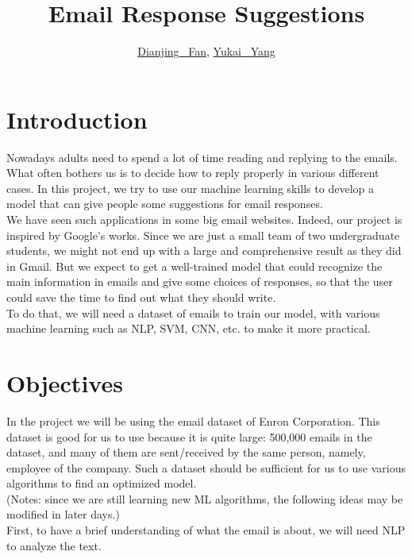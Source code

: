 \documentclass{article}
\title{Email Response Suggestions}
\author{\href{mailto:author1@nyu.edu}{Dianjing \ Fan}, \href{mailto:yy2949@nyu.edu}{Yukai \ Yang}}
\date{\vspace{-5ex}} %
\begin{document}
\maketitle
\thispagestyle{firstpage}

\section*{Introduction}

Nowadays adults need to spend a lot of time reading and replying to the emails. What often bothers us is to decide how to reply properly in various different cases.  In this project, we try to use our machine learning skills to develop a model that can give people some suggestions for email responses.\\ 
We have seen such applications in some big email websites. Indeed, our project is inspired by Google's works. Since we are just a small team of two undergraduate students, we might not end up with a large and comprehensive result as they did in Gmail. But we expect to get a well-trained model that could recognize the main information in emails and give some choices of responses, so that the user could save the time to find out what they should write.\\
To do that, we will need a dataset of emails to train our model, with various machine learning such as NLP, SVM, CNN, etc. to make it more practical.

\section*{Objectives}

In the project we will be using the email dataset of Enron Corporation. This dataset is good for us to use because it is quite large: 500,000 emails in the dataset, and many of them are sent/received by the same person, namely, employee of the company. Such a dataset should be sufficient for us to use various algorithms to find an optimized model.\\
(Notes: since we are still learning new ML algorithms, the following ideas may be modified in later days.)\\
First, to have a brief understanding of what the email is about, we will need NLP to analyze the text.



\end{document}

